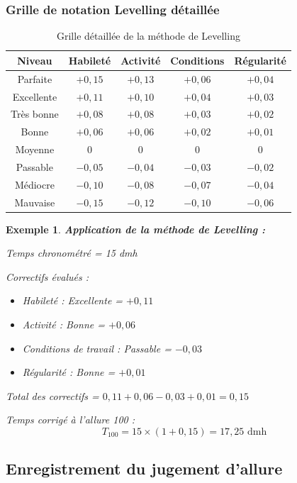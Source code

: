 \documentclass[a4paper,12pt]{article}
\newtheorem{exemple}{Exemple}[section]
\begin{document}
\subsubsection{Grille de notation Levelling détaillée}

\begin{table}[ht]
\centering
\begin{tabular}{|c|c|c|c|c|}
\hline
\textbf{Niveau} & \textbf{Habileté} & \textbf{Activité} & \textbf{Conditions} & \textbf{Régularité} \\
\hline
Parfaite & $+0,15$ & $+0,13$ & $+0,06$ & $+0,04$ \\
Excellente & $+0,11$ & $+0,10$ & $+0,04$ & $+0,03$ \\
Très bonne & $+0,08$ & $+0,08$ & $+0,03$ & $+0,02$ \\
Bonne & $+0,06$ & $+0,06$ & $+0,02$ & $+0,01$ \\
Moyenne & $0$ & $0$ & $0$ & $0$ \\
Passable & $-0,05$ & $-0,04$ & $-0,03$ & $-0,02$ \\
Médiocre & $-0,10$ & $-0,08$ & $-0,07$ & $-0,04$ \\
Mauvaise & $-0,15$ & $-0,12$ & $-0,10$ & $-0,06$ \\
\hline
\end{tabular}
\caption{Grille détaillée de la méthode de Levelling}
\end{table}

\begin{exemple}
\textbf{Application de la méthode de Levelling :}

Temps chronométré = 15 dmh

Correctifs évalués :
\begin{itemize}
    \item Habileté : Excellente = $+0,11$
    \item Activité : Bonne = $+0,06$
    \item Conditions de travail : Passable = $-0,03$
    \item Régularité : Bonne = $+0,01$
\end{itemize}

Total des correctifs = $0,11 + 0,06 - 0,03 + 0,01 = 0,15$

Temps corrigé à l'allure 100 :
\[
T_{100} = 15 \times (1 + 0,15) = 17,25 \text{ dmh}
\]
\end{exemple}

\subsection{Enregistrement du jugement d'allure}
\end{document}
